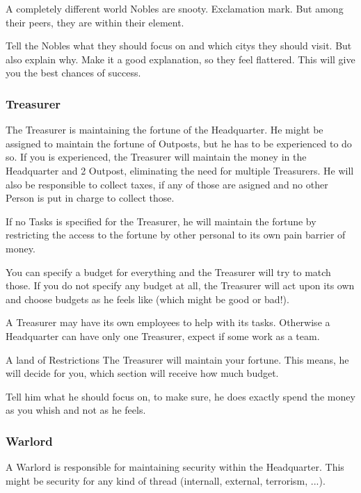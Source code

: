 \begin{paperbox}{A completely different world}
Nobles are snooty. Exclamation mark. But among their peers, they are within their element. 

Tell the Nobles what they should focus on and which citys they should visit. But also explain why. Make it a good explanation, so they feel flattered. This will give you the best chances of success.
\end{paperbox}

\subsubsection{Treasurer}

The Treasurer is maintaining the fortune of the Headquarter. He might be assigned to maintain the fortune of Outposts, but he has to be experienced to do so. If you is experienced, the Treasurer will maintain the money in the Headquarter and 2 Outpost, eliminating the need for multiple Treasurers. He will also be responsible to collect taxes, if any of those are asigned and no other Person is put in charge to collect those.

If no Tasks is specified for the Treasurer, he will maintain the fortune by restricting the access to the fortune by other personal to its own pain barrier of money.

You can specify a budget for everything and the Treasurer will try to match those. If you do not specify any budget at all, the Treasurer will act upon its own and choose budgets as he feels like (which might be good or bad!).

A Treasurer may have its own employees to help with its tasks. Otherwise a Headquarter can have only one Treasurer, expect if some work as a team.

\begin{paperbox}{A land of Restrictions}
The Treasurer will maintain your fortune. This means, he will decide for you, which section will receive how much budget. 

Tell him what he should focus on, to make sure, he does exactly spend the money as you whish and not as he feels.
\end{paperbox}

\subsubsection{Warlord}

A Warlord is responsible for maintaining security within the Headquarter. This might be security for any kind of thread (internall, external, terrorism, ...).

